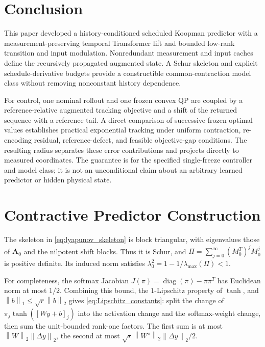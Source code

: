 \documentclass[journal]{IEEEtran}
\newcommand{\mA}{\mathbf{A}}
\newcommand{\norm}[1]{\left\lVert #1\right\rVert}
\begin{document}
\section{Conclusion}
\label{sec:conclusion}
This paper developed a history-conditioned scheduled Koopman predictor with a measurement-preserving temporal Transformer lift and bounded low-rank transition and input modulation. Nonredundant measurement and input caches define the recursively propagated augmented state. A Schur skeleton and explicit schedule-derivative budgets provide a constructible common-contraction model class without removing nonconstant history dependence.

For control, one nominal rollout and one frozen convex QP are coupled by a reference-relative augmented tracking objective and a shift of the returned sequence with a reference tail. A direct comparison of successive frozen optimal values establishes practical exponential tracking under uniform contraction, re-encoding residual, reference-defect, and feasible objective-gap conditions. The resulting radius separates these error contributions and projects directly to measured coordinates. The guarantee is for the specified single-freeze controller and model class; it is not an unconditional claim about an arbitrary learned predictor or hidden physical state.

\appendices
\section{Contractive Predictor Construction}
\label{app:construction}
The skeleton in \eqref{eq:lyapunov_skeleton} is block triangular, with eigenvalues those of $\mA_0$ and the nilpotent shift blocks. Thus it is Schur, and $\Pi=\sum_{j=0}^{\infty}(M_0^T)^jM_0^j$ is positive definite. Its induced norm satisfies $\lambda_0^2=1-1/\lambda_{\max}(\Pi)<1$.

For completeness, the softmax Jacobian $J(\pi)=\operatorname{diag}(\pi)-\pi\pi^T$ has Euclidean norm at most $1/2$. Combining this bound, the $1$-Lipschitz property of $\tanh$, and $\norm{b}_1\le\sqrt r\norm{b}_2$ gives \eqref{eq:Lipschitz_constants}: split the change of $\pi_j\tanh([Wy+b]_j)$ into the activation change and the softmax-weight change, then sum the unit-bounded rank-one factors. The first sum is at most $\norm{W}_2\norm{\Delta y}_2$, the second at most $\sqrt r\norm{W^\pi}_2\norm{\Delta y}_2/2$.
\end{document}
